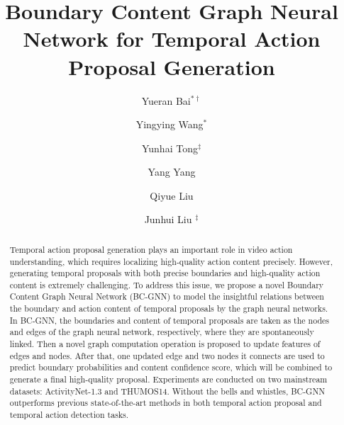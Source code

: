 \documentclass[runningheads]{llncs}
\begin{document}
\pagestyle{headings}
\mainmatter
\def\ECCVSubNumber{6021}  

\title{Boundary Content Graph Neural Network for Temporal Action Proposal Generation} 

\begin{comment}
\titlerunning{ECCV-20 submission ID \ECCVSubNumber}
\authorrunning{ECCV-20 submission ID \ECCVSubNumber}
\author{Anonymous ECCV submission}
\institute{Paper ID \ECCVSubNumber}
\end{comment}


\author{Yueran Bai$^{* \dagger}$ \and Yingying Wang$^{*}$ \and Yunhai Tong$^{\ddag}$ \and Yang Yang  \and Qiyue Liu  \and Junhui Liu $^{\ddag}$ }


\maketitle

\begin{abstract}
Temporal action proposal generation plays an important role in video action understanding, which requires localizing high-quality action content precisely. However, generating temporal proposals with both precise boundaries and high-quality action content is extremely challenging. To address this issue, we propose a novel Boundary Content Graph Neural Network (BC-GNN) to model the insightful relations between the boundary and action content of temporal proposals by the graph neural networks. In BC-GNN, the boundaries and content of temporal proposals are taken as the nodes and edges of the graph neural network, respectively, where they are spontaneously linked. Then a novel graph computation operation is proposed to update features of edges and nodes. After that, one updated edge and two nodes it connects are used to predict boundary probabilities and content confidence score, which will be combined to generate a final high-quality proposal. Experiments are conducted on two mainstream datasets: ActivityNet-1.3 and THUMOS14. Without the bells and whistles, BC-GNN outperforms previous state-of-the-art
methods in both temporal action proposal and temporal action detection tasks.
\end{abstract}
\renewcommand{\thefootnote}{}
\end{document}
